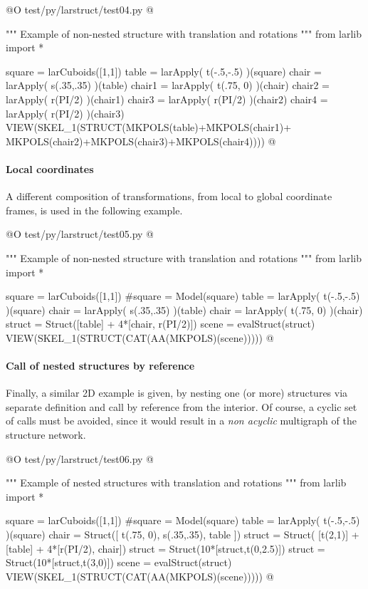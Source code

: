 \documentclass[11pt,oneside]{article}    %
\begin{document}
@O test/py/larstruct/test04.py
@{""" Example of non-nested structure with translation and rotations """
from larlib import *

square = larCuboids([1,1])
table = larApply( t(-.5,-.5) )(square)
chair = larApply( s(.35,.35) )(table)
chair1 = larApply( t(.75, 0) )(chair)
chair2 = larApply( r(PI/2) )(chair1)
chair3 = larApply( r(PI/2) )(chair2)
chair4 = larApply( r(PI/2) )(chair3)
VIEW(SKEL_1(STRUCT(MKPOLS(table)+MKPOLS(chair1)+
                   MKPOLS(chair2)+MKPOLS(chair3)+MKPOLS(chair4))))
@}

\paragraph{Local coordinates}
A different composition of transformations, from local to global coordinate frames, is used in the following example.

@O test/py/larstruct/test05.py
@{""" Example of non-nested structure with translation and rotations """
from larlib import *

square = larCuboids([1,1])
#square = Model(square)
table = larApply( t(-.5,-.5) )(square)
chair = larApply( s(.35,.35) )(table)
chair = larApply( t(.75, 0) )(chair)
struct = Struct([table] + 4*[chair, r(PI/2)])
scene = evalStruct(struct)
VIEW(SKEL_1(STRUCT(CAT(AA(MKPOLS)(scene)))))
@}

\paragraph{Call of nested structures by reference}
Finally, a similar 2D example is given, by nesting one (or more) structures via separate definition and call by reference from the interior. Of course, a cyclic set of calls must be avoided, since it would result in a \emph{non acyclic} multigraph of the structure network.

@O test/py/larstruct/test06.py
@{""" Example of nested structures with translation and rotations """
from larlib import *

square = larCuboids([1,1])
#square = Model(square)
table = larApply( t(-.5,-.5) )(square)
chair = Struct([ t(.75, 0), s(.35,.35), table ])
struct = Struct( [t(2,1)] + [table] + 4*[r(PI/2), chair])
struct = Struct(10*[struct,t(0,2.5)])
struct = Struct(10*[struct,t(3,0)])
scene = evalStruct(struct)
VIEW(SKEL_1(STRUCT(CAT(AA(MKPOLS)(scene)))))
@}
\end{document}
